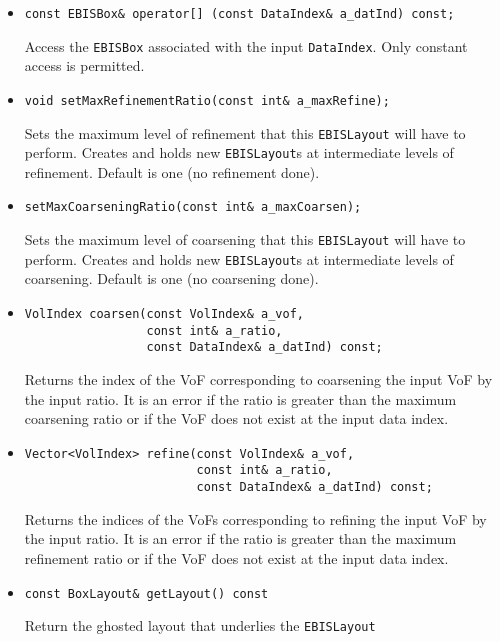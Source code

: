 \begin{itemize}
\item \begin{verbatim}
const EBISBox& operator[] (const DataIndex& a_datInd) const;
\end{verbatim}
Access the {\tt EBISBox} associated with the input {\tt DataIndex}.
Only constant access is permitted.

\item \begin{verbatim}
void setMaxRefinementRatio(const int& a_maxRefine);
\end{verbatim}
Sets the maximum level of refinement that this {\tt EBISLayout}
will have to perform.  Creates and holds new {\tt EBISLayout}s
at intermediate levels of refinement.
Default is one (no refinement done).

\item \begin{verbatim}
setMaxCoarseningRatio(const int& a_maxCoarsen);
\end{verbatim}
Sets the maximum level of coarsening that this {\tt EBISLayout}
will have to perform.  Creates and holds new {\tt EBISLayout}s
at intermediate levels of coarsening.
Default is one (no coarsening done).

\item \begin{verbatim}
VolIndex coarsen(const VolIndex& a_vof,
                 const int& a_ratio,
                 const DataIndex& a_datInd) const;
\end{verbatim}
Returns the index of the VoF corresponding to coarsening
the input VoF by the input ratio.  It is an error if
the ratio is greater than the maximum coarsening ratio
or if the VoF does not exist at the input data index.

\item \begin{verbatim}
Vector<VolIndex> refine(const VolIndex& a_vof,
                        const int& a_ratio,
                        const DataIndex& a_datInd) const;
\end{verbatim}
Returns the indices of the VoFs corresponding to refining
the input VoF by the input ratio.  It is an error if
the ratio is greater than the maximum refinement ratio
or if the VoF does not exist at the input data index.


\item \begin{verbatim}
const BoxLayout& getLayout() const
\end{verbatim}
Return the ghosted layout that underlies the {\tt EBISLayout}
\end{itemize}


